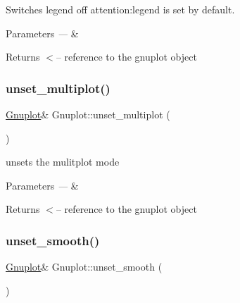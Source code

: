 Switches legend off attention\+:legend is set by default. 


\begin{DoxyParams}{Parameters}
{\em ---} & ~\newline
 \\
\hline
\end{DoxyParams}
\begin{DoxyReturn}{Returns}
$<$-- reference to the gnuplot object 
\end{DoxyReturn}
\mbox{\label{class_gnuplot_aad76cdec16cfb5fdf82f45ed2786f4d8}} 
\subsubsection{\texorpdfstring{unset\+\_\+multiplot()}{unset\_multiplot()}}
{\footnotesize\ttfamily \mbox{\hyperlink{class_gnuplot}{Gnuplot}}\& Gnuplot\+::unset\+\_\+multiplot (\begin{DoxyParamCaption}{ }\end{DoxyParamCaption})\hspace{0.3cm}{\ttfamily [inline]}}

unsets the mulitplot mode


\begin{DoxyParams}{Parameters}
{\em ---} & \\
\hline
\end{DoxyParams}
\begin{DoxyReturn}{Returns}
$<$-- reference to the gnuplot object 
\end{DoxyReturn}
\mbox{\label{class_gnuplot_ad9dfbccd66dece1dbe5803605c6ab08c}} 
\subsubsection{\texorpdfstring{unset\+\_\+smooth()}{unset\_smooth()}}
{\footnotesize\ttfamily \mbox{\hyperlink{class_gnuplot}{Gnuplot}}\& Gnuplot\+::unset\+\_\+smooth (\begin{DoxyParamCaption}{ }\end{DoxyParamCaption})\hspace{0.3cm}{\ttfamily [inline]}}



